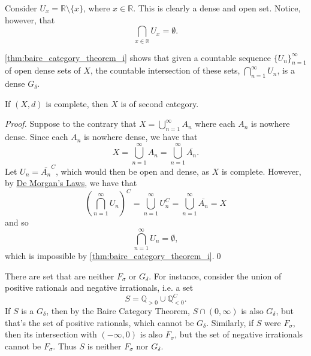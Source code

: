 \documentclass[notoc,notitlepage]{tufte-book}
\begin{document}
\begin{eg}
  Consider $U_x = \mathbb{R} \setminus \{ x \}$, where $x \in \mathbb{R}$. This is clearly a dense and open set. Notice, however, that
  \begin{equation*}
    \bigcap_{x \in \mathbb{R}} U_x = \emptyset.
  \end{equation*}
\end{eg}

\begin{remark}
  \cref{thm:baire_category_theorem_i} shows that given a countable sequence $\{ U_n \}_{n = 1}^{\infty}$ of open dense sets of $X$, the countable intersection of these sets, $\bigcap_{n=1}^{\infty} U_n$, is a dense $G_\delta$.
\end{remark}

\begin{thm}\label{thm:baire_category_theorem_ii}
  If $(X, d)$ is complete, then $X$ is of second category.
\end{thm}

\begin{proof}
  Suppose to the contrary that $X = \bigcup_{n=1}^{\infty} A_n$ where each $A_n$ is nowhere dense. Since each $A_n$ is nowhere dense, we have that
  \begin{equation*}
    X = \bigcup_{n=1}^{\infty} A_n = \bigcup_{n=1}^{\infty} \bar{A_n}.
  \end{equation*}
  Let $U_n = \bar{A_n}^C$, which would then be open and dense, as $X$ is complete. However, by \hyperref[thm:de_morgan_s_laws]{De Morgan's Laws}, we have that
  \begin{equation*}
    \left( \bigcap_{n=1}^{\infty} U_n \right)^C = \bigcup_{n=1}^{\infty} U_n^C = \bigcup_{n=1}^{\infty} \bar{A_n} = X
  \end{equation*}
  and so
  \begin{equation*}
    \bigcap_{n=1}^{\infty} U_n = \emptyset,
  \end{equation*}
  which is impossible by \cref{thm:baire_category_theorem_i}.\qed\
\end{proof}

\begin{eg}
  There are set that are neither $F_\sigma$ or $G_\delta$. For instance, consider the union of positive rationals and negative irrationals, i.e. a set
  \begin{equation*}
    S = \mathbb{Q}_{> 0} \cup \mathbb{Q}^C_{< 0}.
  \end{equation*}
  If $S$ is a $G_\delta$, then by the Baire Category Theorem, $S \cap (0, \infty)$ is also $G_\delta$, but that's the set of positive rationals, which cannot be $G_\delta$. Similarly, if $S$ were $F_\sigma$, then its intersection with $(-\infty, 0)$ is also $F_\sigma$, but the set of negative irrationals cannot be $F_\sigma$. Thus $S$ is neither $F_\sigma$ nor $G_\delta$.
\end{eg}
\end{document}
